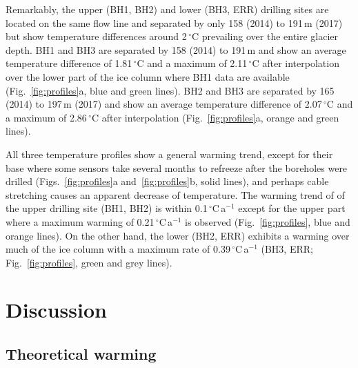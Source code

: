 \documentclass[utf8]{article}
\begin{document}
    Remarkably, the upper (BH1, BH2) and lower (BH3, ERR) drilling sites are
    located on the same flow line and separated by only 158 (2014) to 191\,m
    (2017) but show temperature differences around 2\,$^\circ$C prevailing over
    the entire glacier depth.  BH1 and BH3 are separated by 158 (2014) to
    191\,m and show an average temperature difference of 1.81\,$^\circ$C and a
    maximum of 2.11\,$^\circ$C after interpolation over the lower part of the
    ice column where BH1 data are available (Fig.~\ref{fig:profiles}a, blue and
    green lines). BH2 and BH3 are separated by 165 (2014) to 197\,m (2017) and
    show an average temperature difference of 2.07\,$^\circ$C and a maximum of
    2.86\,$^\circ$C after interpolation (Fig.~\ref{fig:profiles}a, orange and
    green lines).

    All three temperature profiles show a general warming trend, except for
    their base where some sensors take several months to refreeze after the
    boreholes were drilled (Figs.~\ref{fig:profiles}a and~\ref{fig:profiles}b,
    solid lines), and perhaps cable stretching causes an apparent decrease of
    temperature. The warming trend of of the upper drilling site (BH1, BH2) is
    within 0.1\,$^\circ$C\,a$^{-1}$ except for the upper part where a maximum
    warming of 0.21\,$^\circ$C\,a$^{-1}$ is observed (Fig.~\ref{fig:profiles},
    blue and orange lines). On the other hand, the lower (BH2, ERR) exhibits a
    warming over much of the ice column with a maximum rate of
    0.39\,$^\circ$C\,a$^{-1}$ (BH3, ERR; Fig.~\ref{fig:profiles}, green and
    grey lines).


\section{Discussion}

\subsection{Theoretical warming}
\end{document}
